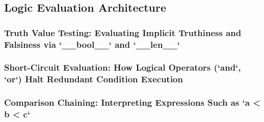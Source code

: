 \subsection{Logic Evaluation Architecture}
\subsubsection{Truth Value Testing: Evaluating Implicit Truthiness and Falsiness via `__bool__` and `__len__`}
\subsubsection{Short-Circuit Evaluation: How Logical Operators (`and`, `or`) Halt Redundant Condition Execution}
\subsubsection{Comparison Chaining: Interpreting Expressions Such as `a < b < c`}
